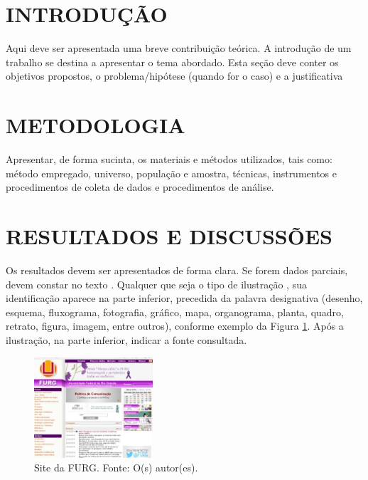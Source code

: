 \documentclass{furgmpu}
\begin{document}
    \maketitle
    
    
    \section{INTRODUÇÃO}
    Aqui deve ser apresentada uma breve contribuição teórica. A introdução de um trabalho se destina a apresentar o tema abordado. Esta seção deve conter os objetivos propostos, o problema/hipótese (quando for o caso) e a justificativa 

    \section{METODOLOGIA}
    Apresentar, de forma sucinta, os materiais e métodos utilizados, tais como: método empregado, universo, população e amostra, técnicas, instrumentos e procedimentos de coleta de dados e procedimentos de análise. 
    
    \section{RESULTADOS E DISCUSSÕES}
    Os resultados devem ser apresentados de forma clara. Se forem dados parciais, devem constar no texto \cite{exemplo01}.  
    Qualquer que seja o tipo de ilustração \cite{exemplo02}, sua identificação aparece na parte inferior, precedida da palavra designativa (desenho, esquema, fluxograma, fotografia, gráfico, mapa, organograma, planta, quadro, retrato, figura, imagem, entre outros), conforme exemplo da Figura \ref{fig:exemplo}. Após a ilustração, na parte inferior, indicar a fonte consultada. 
    \begin{figure}[ht]
        \centering
        \includegraphics[width=4.43cm, scale=1]{exemplo.jpg}
        \caption{Site da FURG. Fonte: O(s) autor(es).}
        \label{fig:exemplo}
    \end{figure}
    
\end{document}
